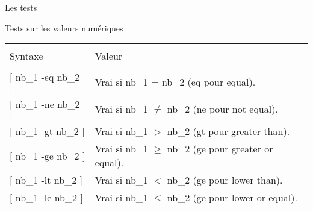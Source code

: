 \begin{frame}{Les tests}
	\begin{block}{Tests sur les valeurs numériques}
		\begin{center}
			\begin{tabular}{ll}
				\hline\\
				Syntaxe&Valeur\\
				\hline\\
				$[$ nb\_1 -eq nb\_2 $]$&Vrai si nb\_1 = nb\_2 (eq pour equal).\\[2pt]
				$[$ nb\_1 -ne nb\_2 $]$&Vrai si nb\_1 $\neq$ nb\_2 (ne pour not equal).\\[2pt]
				$[$ nb\_1 -gt nb\_2 $]$&Vrai si nb\_1 $>$ nb\_2 (gt pour greater than).\\[2pt]
				$[$ nb\_1 -ge nb\_2 $]$&Vrai si nb\_1 $\geq$ nb\_2 (ge pour greater or equal).\\[2pt]
				$[$ nb\_1 -lt nb\_2 $]$&Vrai si nb\_1 $<$ nb\_2 (ge pour lower than).\\[2pt]
				$[$ nb\_1 -le nb\_2 $]$&Vrai si nb\_1 $\leq$ nb\_2 (ge pour lower or equal).\\[2pt]
				\hline
			\end{tabular}
		\end{center}
	\end{block}

\end{frame}
